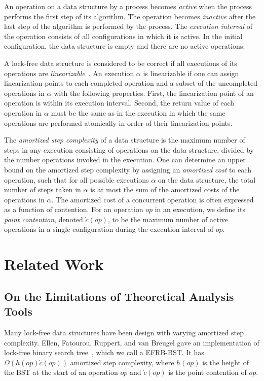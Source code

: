 \documentclass[letterpaper,twocolumn]{article}
\begin{document}
An operation on a data structure by a process becomes \textit{active} when the process performs the first step of its algorithm. The operation becomes \textit{inactive} after the last step of the algorithm is performed by the process. The \textit{execution interval} of the operation consists of all configurations in which it is active. In the initial configuration, the data structure is empty and there are no active operations. 

A lock-free data structure is considered to be correct if all executions of its operations are \textit{linearizable}~\cite{AttiyaW04}. An execution $\alpha$ is linearizable if one can assign linearization points to each completed operation and a subset of the uncompleted operations in $\alpha$ with the following properties. First, the linearization point of an operation is within its execution interval. Second, the return value of each operation in $\alpha$ must be the same as in the execution in which the same operations are performed atomically in order of their linearization points. 

The \textit{amortized step complexity} of a data structure is the maximum number of steps in any execution consisting of operations on the data structure, divided by the number operations invoked in the execution. One can determine an upper bound on the amortized step complexity by assigning an \textit{amortized cost} to each operation, such that for all possible executions $\alpha$ on the data structure, the total number of steps taken in $\alpha$ is at most the sum of the amortized costs of the operations in $\alpha$. The amortized cost of a concurrent operation is often expressed as a function of contention. For an operation $op$ in an execution, we define its \textit{point contention}, denoted $\dot{c}(op)$, to be the maximum number of active operations in a single configuration during the execution interval of $op$. 

\section{Related Work}\label{section_related}

\subsection{On the Limitations of Theoretical Analysis Tools}
Many lock-free data structures have been design with varying amortized step complexity. Ellen, Fatourou, Ruppert, and van Breugel gave an implementation of lock-free binary search tree~\cite{EllenFRB10}, which we call a EFRB-BST. It has $\Omega(h(op)\dot{c}(op))$ amortized step complexity, where $h(op)$ is the height of the BST at the start of an operation $op$ and $\dot{c}(op)$ is the point contention of $op$. 
\end{document}
